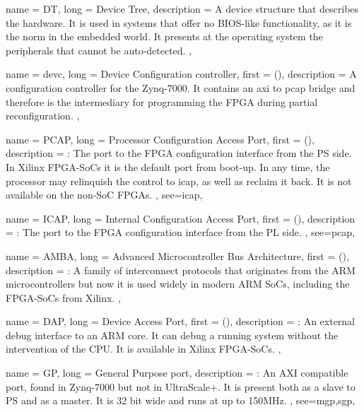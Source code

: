 {
	name = {DT},
	long = {Device Tree},
	description = {
		A device structure that describes the hardware.
		It is used in systems that offer no BIOS-like functionality,
		as it is the norm in the embedded world. It presents 
		at the operating system the peripherals that cannot be auto-detected.
	},
}

{
	name = {devc},
	long = {Device Configuration controller},
	first = { ()},
	description = {
		A configuration controller for the Zynq-7000.
		It contains an \gls{axi} to \gls{pcap} bridge
		and therefore is the intermediary
		for programming the FPGA during partial reconfiguration.
	},
}

{
	name = {PCAP},
	long = {Processor Configuration Access Port},
	first = { ()},
	description = {\emph{}:
		The port to the FPGA configuration interface from the PS side.
		In Xilinx FPGA-SoCs it is the default port from boot-up.
		In any time, the processor may relinquish the control to \gls{icap},
		as well as reclaim it back. It is not available on the non-SoC FPGAs.
	},
	see={icap},
}

{
	name = {ICAP},
	long = {Internal Configuration Access Port},
	first = { ()},
	description = {\emph{}:
		The port to the FPGA configuration interface from the PL side.
	},
	see={pcap},
}


{
	name = {AMBA},
	long = {Advanced Microcontroller Bus Architecture},
	first = { ()},
	description = {\emph{}:
		A family of interconnect protocols that originates 
		from the ARM microcontrollers but now it is used widely
		in modern ARM SoCs, including the FPGA-SoCs from Xilinx.
	},
}


{
	name = {DAP},
	long = {Device Access Port},
	first = { ()},
	description = {\emph{}:
		An external debug interface to an ARM core. It can debug a running system
		without the intervention of the CPU. It is available in Xilinx FPGA-SoCs.
	},
}

{
	name = {GP},
	long = {General Purpose port},
	description = {\emph{}:
		An AXI compatible port, found in Zynq-7000 but not in UltraScale+.
		It is present both as a slave to PS and as a master. 
		It is 32 bit wide and runs at up to 150MHz.
	},
	see={mgp,sgp},
}

